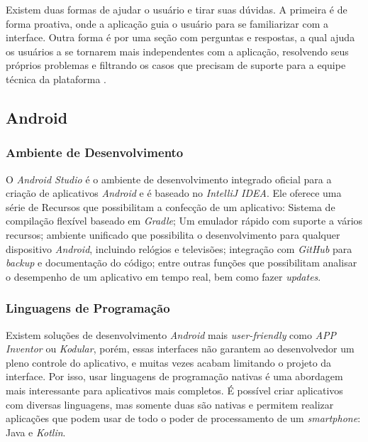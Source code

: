Existem duas formas de ajudar o usuário e tirar suas dúvidas. A primeira é de forma proativa, onde a aplicação guia o usuário para se familiarizar com a interface. Outra forma é por uma seção com perguntas e respostas, a qual ajuda os usuários a se tornarem mais independentes com a aplicação, resolvendo seus próprios problemas e filtrando os casos que precisam de suporte para a equipe técnica da plataforma \cite{site:nielsenHelpandDoc}.

\subsection{Android}
\subsubsection{Ambiente de Desenvolvimento}

O \textit{Android Studio} é o ambiente de desenvolvimento integrado oficial para a criação de aplicativos \textit{Android} e é baseado no \textit{IntelliJ IDEA}. Ele oferece uma série de Recursos que possibilitam a confecção de um aplicativo: Sistema de compilação flexível baseado em \textit{Gradle}; Um emulador rápido com suporte a vários recursos; ambiente unificado que possibilita o desenvolvimento para qualquer dispositivo \textit{Android}, incluindo relógios e televisões; integração com \textit{GitHub} para \textit{backup} e documentação do código; entre outras funções que possibilitam analisar o desempenho de um aplicativo em tempo real, bem como fazer \textit{updates}. \cite{site:androidstudio}

\subsubsection{Linguagens de Programação}

Existem soluções de desenvolvimento \textit{Android} mais \textit{user-friendly} como \textit{APP Inventor} ou \textit{Kodular}, porém, essas interfaces não garantem ao desenvolvedor um pleno controle do aplicativo, e muitas vezes acabam limitando o projeto da interface. Por isso, usar linguagens de programação nativas é uma abordagem mais interessante para aplicativos mais completos. É possível criar aplicativos com diversas linguagens, mas somente duas são nativas e permitem realizar aplicações que podem usar de todo o poder de processamento de um \textit{smartphone}: Java e \textit{Kotlin}.

